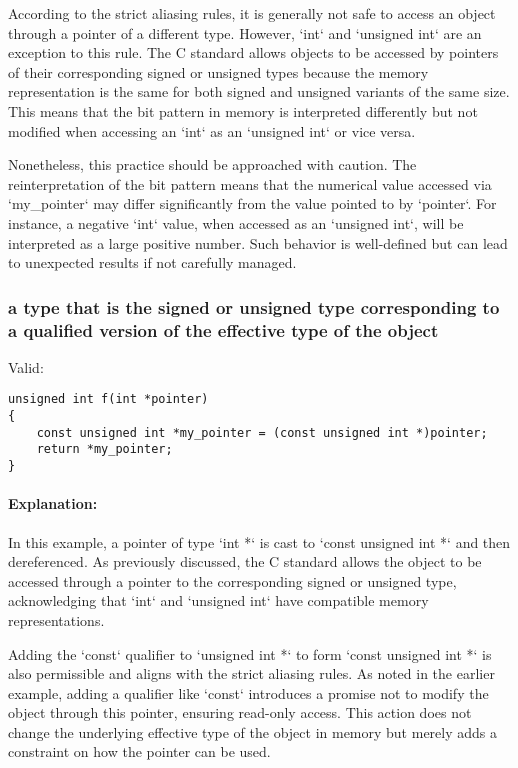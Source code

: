 \documentclass[12pt]{article}
\begin{document}
According to the strict aliasing rules, it is generally not safe to access an object through a pointer of a different type. However, `int` and `unsigned int` are an exception to this rule. The C standard allows objects to be accessed by pointers of their corresponding signed or unsigned types because the memory representation is the same for both signed and unsigned variants of the same size. This means that the bit pattern in memory is interpreted differently but not modified when accessing an `int` as an `unsigned int` or vice versa.

Nonetheless, this practice should be approached with caution. The reinterpretation of the bit pattern means that the numerical value accessed via `my\_pointer` may differ significantly from the value pointed to by `pointer`. For instance, a negative `int` value, when accessed as an `unsigned int`, will be interpreted as a large positive number. Such behavior is well-defined but can lead to unexpected results if not carefully managed.

\subsubsection{a type that is the signed or unsigned type corresponding to a qualified version of the effective type of the object}

Valid:
\begin{lstlisting}
unsigned int f(int *pointer)
{
    const unsigned int *my_pointer = (const unsigned int *)pointer;
    return *my_pointer;
}
\end{lstlisting}

\paragraph{Explanation:}
In this example, a pointer of type `int *` is cast to `const unsigned int *` and then dereferenced. As previously discussed, the C standard allows the object to be accessed through a pointer to the corresponding signed or unsigned type, acknowledging that `int` and `unsigned int` have compatible memory representations.

Adding the `const` qualifier to `unsigned int *` to form `const unsigned int *` is also permissible and aligns with the strict aliasing rules. As noted in the earlier example, adding a qualifier like `const` introduces a promise not to modify the object through this pointer, ensuring read-only access. This action does not change the underlying effective type of the object in memory but merely adds a constraint on how the pointer can be used.
\end{document}
